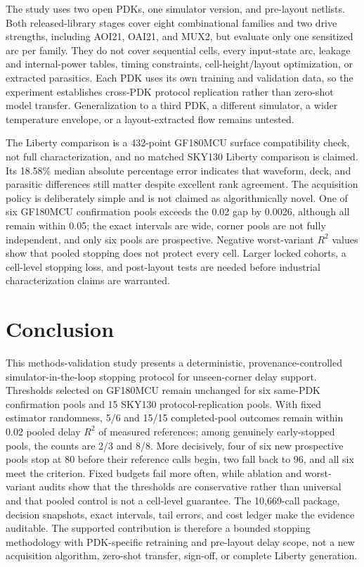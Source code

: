 \documentclass[preprint,12pt]{elsarticle}
\begin{document}
The study uses two open PDKs, one simulator version, and pre-layout netlists. Both released-library stages cover eight combinational families and two drive strengths, including AOI21, OAI21, and MUX2, but evaluate only one sensitized arc per family. They do not cover sequential cells, every input-state arc, leakage and internal-power tables, timing constraints, cell-height/layout optimization, or extracted parasitics. Each PDK uses its own training and validation data, so the experiment establishes cross-PDK protocol replication rather than zero-shot model transfer. Generalization to a third PDK, a different simulator, a wider temperature envelope, or a layout-extracted flow remains untested.

The Liberty comparison is a 432-point GF180MCU surface compatibility check, not full characterization, and no matched SKY130 Liberty comparison is claimed. Its 18.58\% median absolute percentage error indicates that waveform, deck, and parasitic differences still matter despite excellent rank agreement. The acquisition policy is deliberately simple and is not claimed as algorithmically novel. One of six GF180MCU confirmation pools exceeds the 0.02 gap by 0.0026, although all remain within 0.05; the exact intervals are wide, corner pools are not fully independent, and only six pools are prospective. Negative worst-variant $R^2$ values show that pooled stopping does not protect every cell. Larger locked cohorts, a cell-level stopping loss, and post-layout tests are needed before industrial characterization claims are warranted.

\section{Conclusion}

This methods-validation study presents a deterministic, provenance-controlled simulator-in-the-loop stopping protocol for unseen-corner delay support. Thresholds selected on GF180MCU remain unchanged for six same-PDK confirmation pools and 15 SKY130 protocol-replication pools. With fixed estimator randomness, 5/6 and 15/15 completed-pool outcomes remain within 0.02 pooled delay $R^2$ of measured references; among genuinely early-stopped pools, the counts are 2/3 and 8/8. More decisively, four of six new prospective pools stop at 80 before their reference calls begin, two fall back to 96, and all six meet the criterion. Fixed budgets fail more often, while ablation and worst-variant audits show that the thresholds are conservative rather than universal and that pooled control is not a cell-level guarantee. The 10,669-call package, decision snapshots, exact intervals, tail errors, and cost ledger make the evidence auditable. The supported contribution is therefore a bounded stopping methodology with PDK-specific retraining and pre-layout delay scope, not a new acquisition algorithm, zero-shot transfer, sign-off, or complete Liberty generation.
\end{document}
